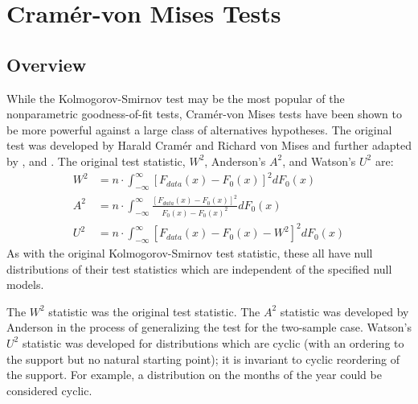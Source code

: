 
\section{Cram\'{e}r-von Mises Tests}

\subsection{Overview}


While the Kolmogorov-Smirnov test may be the most popular of
the nonparametric goodness-of-fit tests, Cram\'{e}r-von Mises
tests have been shown to be more powerful against a large class
of alternatives hypotheses. 
The original test was developed by
Harald Cram\'{e}r and Richard von Mises \citep{cramer1928, vonmises1928} and further adapted by \cite{anderson1952}, and  \cite{Watson1961}. 
The original test statistic, $W^2$, Anderson's $A^2$, and Watson's
$U^2$ are:
\begin{align}
W^2 &= n \cdot \int_{-\infty}^{\infty} \left[ F_{data}(x)- F_{0}(x) \right]^2 dF_0(x) \label{W2} \\
A^2 &= n \cdot \int_{-\infty}^{\infty} \frac{\left[F_{data}(x)- F_{0}(x) \right]^2}{F_0(x) -F_0(x)^2} dF_0(x) \label{A2} \\
U^2 &= n \cdot \int_{-\infty}^{\infty} \left[ F_{data}(x)- F_{0}(x) - W^2 \right]^2 dF_0(x) \label{U2}
\end{align}
As with the original Kolmogorov-Smirnov test statistic, these all have 
null distributions of their test statistics which are independent of the
specified null models.

The $W^2$ statistic was the original test statistic.
The $A^2$ statistic was developed by
Anderson in the process of generalizing the test for the two-sample case.
Watson's $U^2$ statistic was developed for distributions
which are cyclic (with an ordering to the support but
no natural starting point); it is invariant to cyclic reordering of
the support.   For example, a distribution on the months of the year
could be considered cyclic.

